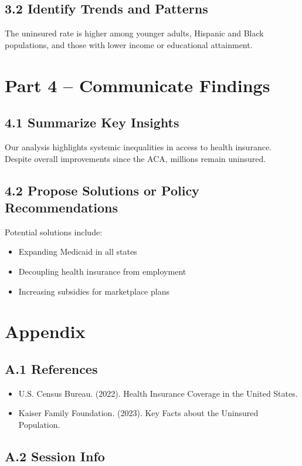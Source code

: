 \documentclass[
]{article}
\providecommand{\tightlist}{%
  \setlength{\itemsep}{0pt}\setlength{\parskip}{0pt}}
\begin{document}
\subsection{3.2 Identify Trends and
Patterns}\label{identify-trends-and-patterns}

The uninsured rate is higher among younger adults, Hispanic and Black
populations, and those with lower income or educational attainment.

\section{Part 4 -- Communicate
Findings}\label{part-4-communicate-findings}

\subsection{4.1 Summarize Key Insights}\label{summarize-key-insights}

Our analysis highlights systemic inequalities in access to health
insurance. Despite overall improvements since the ACA, millions remain
uninsured.

\subsection{4.2 Propose Solutions or Policy
Recommendations}\label{propose-solutions-or-policy-recommendations}

Potential solutions include:

\begin{itemize}
\tightlist
\item
  Expanding Medicaid in all states
\item
  Decoupling health insurance from employment
\item
  Increasing subsidies for marketplace plans
\end{itemize}

\section{Appendix}\label{appendix}

\subsection{A.1 References}\label{a.1-references}

\begin{itemize}
\tightlist
\item
  U.S. Census Bureau. (2022). Health Insurance Coverage in the United
  States.
\item
  Kaiser Family Foundation. (2023). Key Facts about the Uninsured
  Population.
\end{itemize}

\subsection{A.2 Session Info}\label{a.2-session-info}
\end{document}
